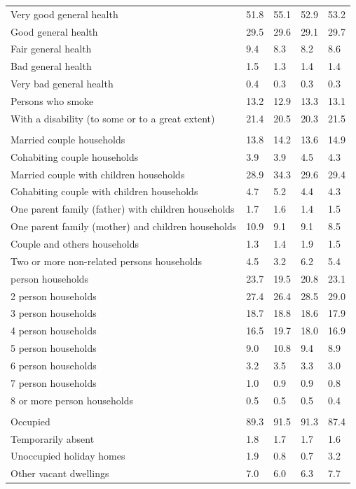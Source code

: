 \documentclass{article}
\begin{document}
\begin{table}[h]
\begin{tabular}{KTTTT}
    \hline
Very good general health & 51.8& 55.1&52.9& 53.2\\
Good general health & 29.5& 29.6& 29.1& 29.7\\
Fair general health & 9.4& 8.3&8.2& 8.6\\
Bad general health & 1.5& 1.3&1.4& 1.4\\
Very bad general health & 0.4& 0.3&0.3& 0.3\\
    \hline
Persons who smoke & 13.2& 12.9&13.3& 13.1\\
    \hline
With a disability (to some or to a great extent) & 21.4& 20.5&20.3& 21.5\\
\hline
    \\ 
    \hline
Married couple households & 13.8& 14.2& 13.6& 14.9\\
Cohabiting couple households & 3.9& 3.9& 4.5& 4.3\\
Married couple with children households & 28.9& 34.3& 29.6& 29.4\\
Cohabiting couple with children households & 4.7& 5.2& 4.4& 4.3\\
One parent family (father) with  children households & 1.7& 1.6& 1.4& 1.5\\
One parent family (mother) and children households & 10.9&  9.1&  9.1&  8.5\\
Couple and others households  & 1.3& 1.4& 1.9& 1.5\\
Two or more non-related persons households & 4.5& 3.2& 6.2& 5.4\\
     person households & 23.7& 19.5& 20.8& 23.1\\
2 person households & 27.4& 26.4& 28.5& 29.0\\
3 person households & 18.7& 18.8& 18.6& 17.9\\
4 person households & 16.5& 19.7& 18.0& 16.9\\
5 person households &  9.0& 10.8&  9.4&  8.9\\
6 person households & 3.2& 3.5& 3.3& 3.0\\
7 person households & 1.0& 0.9& 0.9& 0.8\\
8 or more person households & 0.5& 0.5& 0.5& 0.4\\
\hline
    \\ 
    \hline
Occupied & 89.3& 91.5& 91.3& 87.4\\
Temporarily absent & 1.8& 1.7& 1.7& 1.6\\
Unoccupied holiday homes & 1.9& 0.8& 0.7& 3.2\\
Other vacant dwellings & 7.0& 6.0& 6.3& 7.7\\
\hline
\end{tabular}
\end{table}
\end{document}
